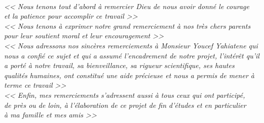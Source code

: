 \documentclass[12pt]{report}
\begin{document}
\newpage

\vspace*{0.5in}

\thispagestyle{empty}

\begin{center}
    \textit{\fontsize{34}{46}{\bfseries{\color{Blue}{Remerciement}}}}
    \vspace{0.7in}
    \textit{
    \\\Large{<< Nous tenons tout d’abord à remercier Dieu de nous avoir donné le courage\\ et la patience pour accomplir ce travail >>}
    \vspace{0.4in}
    \\\Large{<< Nous tenons à exprimer notre grand remerciement à nos très chers parents pour leur soutient moral et leur encouragement >>}
    \vspace{0.4in}
    \\\Large{<< Nous adressons nos sincères remerciements à Monsieur Youcef Yahiatene qui nous a confié ce sujet et qui a assumé l’encadrement de notre projet, l’intérêt qu’il a porté à notre travail, sa bienveillance, sa rigueur scientifique, ses hautes qualités humaines, ont constitué une aide précieuse et nous a permis de mener à terme ce travail >>}
    \vspace{0.4in}
    \\\Large{<< Enfin, mes remerciements s’adressent aussi à tous ceux qui ont participé,\\ de près ou de loin, à l’élaboration de ce projet de fin d’études et en particulier\\ à ma famille et mes amis >>}
    \\}
\end{center}

\newpage

\vspace*{0.2in}

\thispagestyle{empty}
\end{document}
